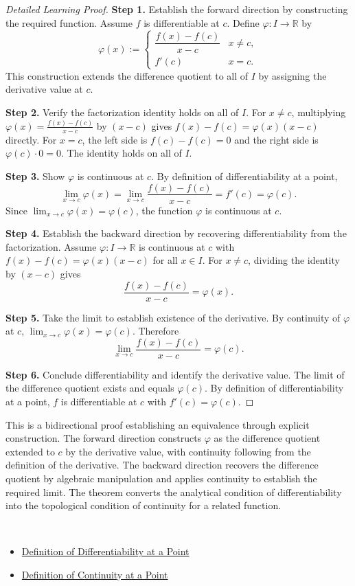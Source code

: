 \begin{proof}[Detailed Learning Proof]
\LRAProofBodyStart

\textbf{Step 1.} Establish the forward direction by constructing the required function. Assume $f$ is differentiable at $c$. Define $\varphi : I \to \mathbb{R}$ by
\[
  \varphi(x) :=
  \begin{cases}
    \dfrac{f(x) - f(c)}{x - c} & x \neq c, \\[6pt]
    f'(c)                       & x = c.
  \end{cases}
\]
This construction extends the difference quotient to all of $I$ by assigning the derivative value at $c$.

\textbf{Step 2.} Verify the factorization identity holds on all of $I$. For $x \neq c$, multiplying $\varphi(x) = \frac{f(x)-f(c)}{x-c}$ by $(x-c)$ gives $f(x) - f(c) = \varphi(x)(x-c)$ directly. For $x = c$, the left side is $f(c) - f(c) = 0$ and the right side is $\varphi(c) \cdot 0 = 0$. The identity holds on all of $I$.

\textbf{Step 3.} Show $\varphi$ is continuous at $c$. By definition of differentiability at a point,
\[
  \lim_{x \to c} \varphi(x)
  = \lim_{x \to c} \frac{f(x) - f(c)}{x - c}
  = f'(c)
  = \varphi(c).
\]
Since $\lim_{x \to c} \varphi(x) = \varphi(c)$, the function $\varphi$ is continuous at $c$.

\textbf{Step 4.} Establish the backward direction by recovering differentiability from the factorization. Assume $\varphi : I \to \mathbb{R}$ is continuous at $c$ with $f(x) - f(c) = \varphi(x)(x-c)$ for all $x \in I$. For $x \neq c$, dividing the identity by $(x - c)$ gives
\[
  \frac{f(x) - f(c)}{x - c} = \varphi(x).
\]

\textbf{Step 5.} Take the limit to establish existence of the derivative. By continuity of $\varphi$ at $c$, $\lim_{x \to c} \varphi(x) = \varphi(c)$. Therefore
\[
  \lim_{x \to c} \frac{f(x) - f(c)}{x - c} = \varphi(c).
\]

\textbf{Step 6.} Conclude differentiability and identify the derivative value. The limit of the difference quotient exists and equals $\varphi(c)$. By definition of differentiability at a point, $f$ is differentiable at $c$ with $f'(c) = \varphi(c)$.
\end{proof}

\begin{remark*}
This is a bidirectional proof establishing an equivalence through explicit construction. The forward direction constructs $\varphi$ as the difference quotient extended to $c$ by the derivative value, with continuity following from the definition of the derivative. The backward direction recovers the difference quotient by algebraic manipulation and applies continuity to establish the required limit. The theorem converts the analytical condition of differentiability into the topological condition of continuity for a related function.
\end{remark*}

\begin{remark*}[Dependencies]~\\
\begin{itemize}
  \item \hyperref[def:differentiability-at-point]{Definition of Differentiability at a Point}
  \item \hyperref[def:continuity-at-point]{Definition of Continuity at a Point}
\end{itemize}
\end{remark*}